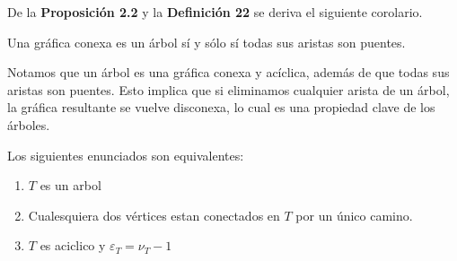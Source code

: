  De la \textbf{Proposición 2.2} y la \textbf{Definición 22} se deriva el siguiente corolario.
 
 \begin{corollary}
     Una gráfica conexa es un árbol sí y sólo sí todas sus aristas son puentes.
 \end{corollary}
\noindent Notamos que un árbol es una gráfica conexa y acíclica, además de que todas sus aristas son puentes. Esto implica que si eliminamos cualquier arista de un árbol, la gráfica resultante se vuelve disconexa, lo cual es una propiedad clave de los árboles.
 \begin{teorema}
 Los siguientes enunciados son equivalentes:
  \begin{enumerate}
         \item $T$ es un arbol
         \item Cualesquiera dos vértices estan conectados en $T$ por un único camino.
         \item $T$ es aciclico y $\varepsilon_T = \nu_T - 1$
\end{enumerate}
     
 \end{teorema}
 

